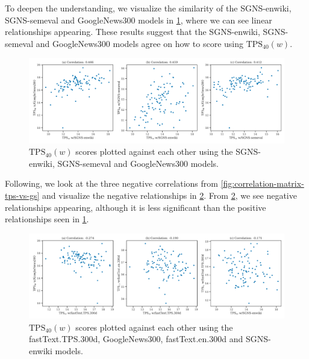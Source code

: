 To deepen the understanding, we visualize the similarity of the SGNS-enwiki, SGNS-semeval and GoogleNews300 models in \cref{fig:tps-vs-gs-top-3-correlation-word-embedding-models}, where we can see linear relationships appearing. These results suggest that the SGNS-enwiki, SGNS-semeval and GoogleNews300 models agree on how to score using $\text{TPS}_{40}(w)$.
\begin{figure}[H]
    \centering
    \includegraphics[width=\textwidth]{thesis/figures/tps-vs-gs-top-3-correlation-word-embedding-models.pdf}
    \caption{$\text{TPS}_{40}(w)$ scores plotted against each other using the SGNS-enwiki, SGNS-semeval and GoogleNews300 models.}
    \label{fig:tps-vs-gs-top-3-correlation-word-embedding-models}
\end{figure}

Following, we look at the three negative correlations from \cref{fig:correlation-matrix-tps-vs-gs} and visualize the negative relationships in \cref{fig:tps-vs-gs-top-3-negative-correlation-word-embedding-models}. From \cref{fig:tps-vs-gs-top-3-negative-correlation-word-embedding-models}, we see negative relationships appearing, although it is less significant than the positive relationships seen in \cref{fig:tps-vs-gs-top-3-correlation-word-embedding-models}.
\begin{figure}[H]
    \centering
    \includegraphics[width=\textwidth]{thesis/figures/tps-vs-gs-top-3-negative-correlation-word-embedding-models.pdf}
    \caption{$\text{TPS}_{40}(w)$ scores plotted against each other using the fastText.TPS.300d, GoogleNews300, fastText.en.300d and SGNS-enwiki models.}
    \label{fig:tps-vs-gs-top-3-negative-correlation-word-embedding-models}
\end{figure}

